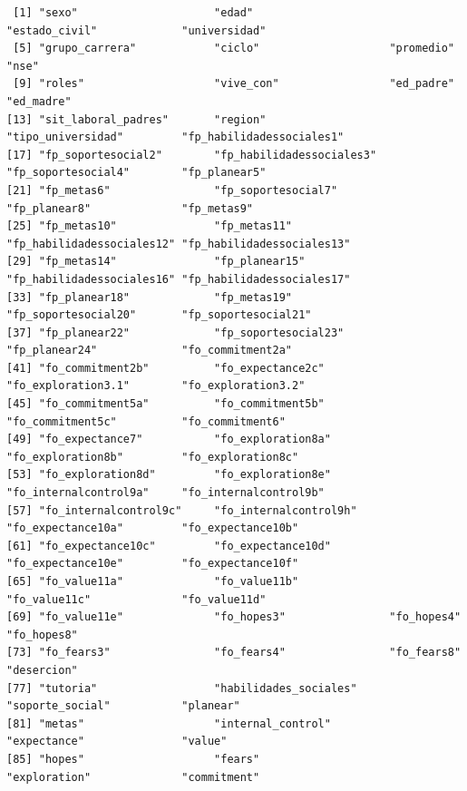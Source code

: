 \documentclass[
  letterpaper,
  DIV=11,
  numbers=noendperiod]{scrartcl}
\begin{document}
\begin{verbatim}
 [1] "sexo"                     "edad"                     "estado_civil"             "universidad"             
 [5] "grupo_carrera"            "ciclo"                    "promedio"                 "nse"                     
 [9] "roles"                    "vive_con"                 "ed_padre"                 "ed_madre"                
[13] "sit_laboral_padres"       "region"                   "tipo_universidad"         "fp_habilidadessociales1" 
[17] "fp_soportesocial2"        "fp_habilidadessociales3"  "fp_soportesocial4"        "fp_planear5"             
[21] "fp_metas6"                "fp_soportesocial7"        "fp_planear8"              "fp_metas9"               
[25] "fp_metas10"               "fp_metas11"               "fp_habilidadessociales12" "fp_habilidadessociales13"
[29] "fp_metas14"               "fp_planear15"             "fp_habilidadessociales16" "fp_habilidadessociales17"
[33] "fp_planear18"             "fp_metas19"               "fp_soportesocial20"       "fp_soportesocial21"      
[37] "fp_planear22"             "fp_soportesocial23"       "fp_planear24"             "fo_commitment2a"         
[41] "fo_commitment2b"          "fo_expectance2c"          "fo_exploration3.1"        "fo_exploration3.2"       
[45] "fo_commitment5a"          "fo_commitment5b"          "fo_commitment5c"          "fo_commitment6"          
[49] "fo_expectance7"           "fo_exploration8a"         "fo_exploration8b"         "fo_exploration8c"        
[53] "fo_exploration8d"         "fo_exploration8e"         "fo_internalcontrol9a"     "fo_internalcontrol9b"    
[57] "fo_internalcontrol9c"     "fo_internalcontrol9h"     "fo_expectance10a"         "fo_expectance10b"        
[61] "fo_expectance10c"         "fo_expectance10d"         "fo_expectance10e"         "fo_expectance10f"        
[65] "fo_value11a"              "fo_value11b"              "fo_value11c"              "fo_value11d"             
[69] "fo_value11e"              "fo_hopes3"                "fo_hopes4"                "fo_hopes8"               
[73] "fo_fears3"                "fo_fears4"                "fo_fears8"                "desercion"               
[77] "tutoria"                  "habilidades_sociales"     "soporte_social"           "planear"                 
[81] "metas"                    "internal_control"         "expectance"               "value"                   
[85] "hopes"                    "fears"                    "exploration"              "commitment"              
\end{verbatim}
\end{document}
